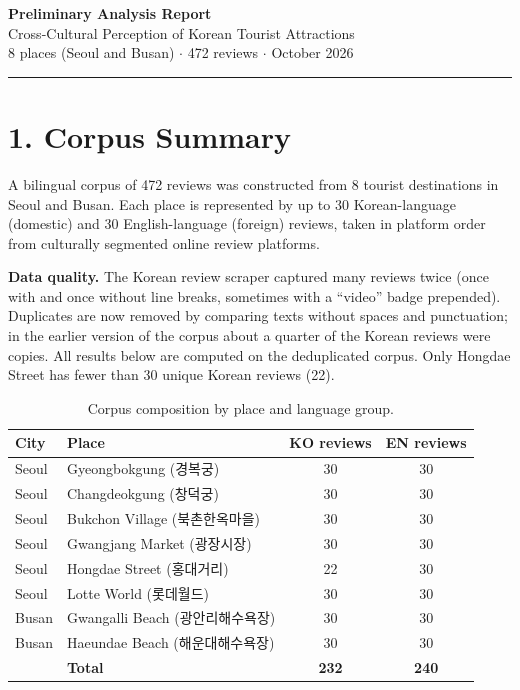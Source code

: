\documentclass[11pt,a4paper]{article}
\begin{document}
\begin{center}
{\Large\textbf{Preliminary Analysis Report}}\\[6pt]
{\large Cross-Cultural Perception of Korean Tourist Attractions}\\[4pt]
{\normalsize 8 places (Seoul and Busan) $\cdot$ 472 reviews $\cdot$ October 2026}
\end{center}

\vspace{8pt}
\noindent\rule{\linewidth}{0.4pt}

\section*{1. Corpus Summary}

A bilingual corpus of 472 reviews was constructed from 8 tourist destinations
in Seoul and Busan. Each place is represented by up to 30 Korean-language
(domestic) and 30 English-language (foreign) reviews, taken in platform order
from culturally segmented online review platforms.

\textbf{Data quality.} The Korean review scraper captured many reviews twice
(once with and once without line breaks, sometimes with a ``video'' badge
prepended). Duplicates are now removed by comparing texts without spaces and
punctuation; in the earlier version of the corpus about a quarter of the
Korean reviews were copies. All results below are computed on the
deduplicated corpus. Only Hongdae Street has fewer than 30 unique Korean
reviews (22).

\begin{table}[H]
\centering
\small
\begin{tabular}{llcc}
\toprule
\textbf{City} & \textbf{Place} & \textbf{KO reviews} & \textbf{EN reviews} \\
\midrule
Seoul  & Gyeongbokgung (경복궁)         & 30 & 30 \\
Seoul  & Changdeokgung (창덕궁)         & 30 & 30 \\
Seoul  & Bukchon Village (북촌한옥마을)   & 30 & 30 \\
Seoul  & Gwangjang Market (광장시장)     & 30 & 30 \\
Seoul  & Hongdae Street (홍대거리)       & 22 & 30 \\
Seoul  & Lotte World (롯데월드)          & 30 & 30 \\
Busan  & Gwangalli Beach (광안리해수욕장) & 30 & 30 \\
Busan  & Haeundae Beach (해운대해수욕장)  & 30 & 30 \\
\midrule
       & \textbf{Total}                 & \textbf{232} & \textbf{240} \\
\bottomrule
\end{tabular}
\caption{Corpus composition by place and language group.}
\end{table}
\end{document}
